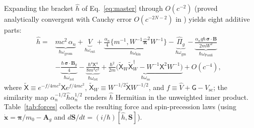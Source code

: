 \documentclass[aps,prd,onecolumn,tightenlines,nofootinbib,notitlepage,10pt,floatfix]{revtex4-2}
\theoremstyle{indentedtheorem}
\begin{document}
Expanding the bracket $\hat{h}$ of Eq.~\eqref{eq:master} through $O(c^{-2})$ (proved analytically convergent with Cauchy error $O(c^{-2N-2})$ in \citet{HutchisonWavefn2026}) yields eight additive parts:
\begin{equation}
    \boxed{\begin{aligned}
    \hat{h} = {} & \underbrace{mc^2\,\alpha_n}_{\hbar\omega_\text{geom}} + \underbrace{V}_{\hbar\omega_\text{ext}} + \underbrace{\frac{\alpha_n}{4}\big\{m^{-1},W^{-1}\hat{\boldsymbol{\pi}}^2 W^{-1}\big\}}_{\hbar\omega_\text{kin}} - \underbrace{\hat{\Pi}_g}_{\hbar\omega_\text{gm}} - \underbrace{\frac{\alpha_n q\hbar\,\boldsymbol{\sigma}\cdot\mathbf{B}}{2mW^2}}_{\hbar\omega_\text{Pauli}} \\
    & - \underbrace{\frac{\hbar\,\boldsymbol{\sigma}\cdot\mathbf{B}_g}{4}}_{\hbar\omega_\text{rot}} - \underbrace{\frac{\hbar^4\mathsf{X}^4}{8m^3 c^2}}_{\hbar\omega_\text{rel}} + \underbrace{\frac{\hbar^2}{2m}\big(\tilde{\mathsf{X}}_W\tilde{\mathsf{X}}_W^\dagger - W^{-1}\mathsf{X}^2 W^{-1}\big)}_{\hbar\omega_\text{so}} + O(c^{-4}) ,
    \end{aligned}}
    \label{eq:nr_expansion}
\end{equation}
where $\tilde{\mathsf{X}}\equiv e^{-f/4mc^2}\mathsf{X}e^{f/4mc^2}$, $\tilde{\mathsf{X}}_W\equiv W^{-1/2}\tilde{\mathsf{X}}W^{-1/2}$, and $f\equiv\hat{V}+\mathsf{G}-V_\text{sc}$; the similarity map $\alpha_n^{-1/2}\hat{h}\alpha_n^{1/2}$ renders $\hat{h}$ Hermitian in the unweighted inner product. Table~\ref{tab:forces} collects the resulting force and spin-precession laws (using $\dot{\mathbf{x}}=\boldsymbol{\pi}/m_0-\mathbf{A}_g$ and $d\mathbf{S}/dt=(i/\hbar)[\hat{h},\mathbf{S}]$).
\end{document}
